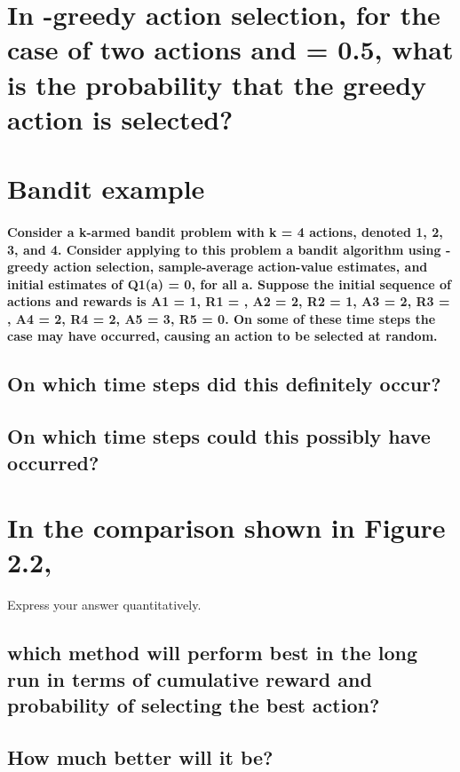 \documentclass{article}
\begin{document}
\maketitle

\section{In \textepsilon-greedy action selection, for the case of two actions and \textepsilon \thickspace = 0.5, what is the probability that the greedy action is selected?}

\section{Bandit example}
\paragraph{Consider a k-armed bandit problem with k = 4 actions, denoted 1, 2, 3, and 4. Consider applying to this problem a bandit algorithm using \textepsilon-greedy action selection, sample-average action-value estimates, and initial estimates of Q1(a) = 0, for all a. Suppose the initial sequence of actions and rewards is A1 = 1, R1 = , A2 = 2, R2 = 1, A3 = 2, R3 = , A4 = 2, R4 = 2, A5 = 3, R5 = 0. On some of these time steps the \textepsilon \thickspace case may have occurred, causing an action to be selected at random.}
\subsection{On which time steps did this definitely occur?}
\subsection{On which time steps could this possibly have occurred?}

\section{In the comparison shown in Figure 2.2, }
Express your answer quantitatively.
\subsection{which method will perform best in the long run in terms of cumulative reward and probability of selecting the best action?}
\subsection{How much better will it be?}
\end{document}
